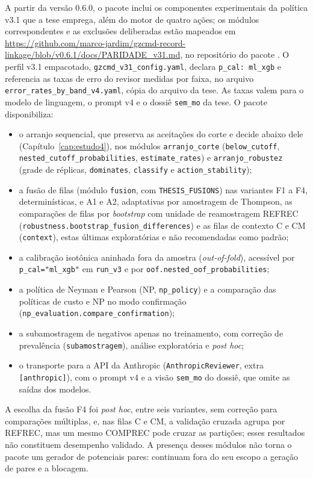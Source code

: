 A partir da versão 0.6.0, o pacote inclui os componentes experimentais da política v3.1 que a tese emprega, além do motor de quatro ações; os módulos correspondentes e as exclusões deliberadas estão mapeados em \url{https://github.com/marco-jardim/gzcmd-record-linkage/blob/v0.6.1/docs/PARIDADE_v31.md}, no repositório do pacote \cite{Jardim2026gzcmd}. O perfil v3.1 empacotado, \texttt{gzcmd\_v31\_config.yaml}, declara \texttt{p\_cal: ml\_xgb} e referencia as taxas de erro do revisor medidas por faixa, no arquivo \texttt{error\_rates\_by\_band\_v4.yaml}, cópia do arquivo da tese. As taxas valem para o modelo de linguagem, o prompt v4 e o dossiê \texttt{sem\_mo} da tese. O pacote disponibiliza:
\begin{itemize}
\item o arranjo sequencial, que preserva as aceitações do corte e decide abaixo dele (Capítulo~\ref{cap:estudo4}), nos módulos \texttt{arranjo\_corte} (\texttt{below\_cutoff}, \texttt{nested\_cutoff\_probabilities}, \texttt{estimate\_rates}) e \texttt{arranjo\_robustez} (grade de réplicas, \texttt{dominates}, \texttt{classify} e \texttt{action\_stability});
\item a fusão de filas (módulo \texttt{fusion}, com \texttt{THESIS\_FUSIONS}) nas variantes F1 a F4, determinísticas, e A1 e A2, adaptativas por amostragem de Thompson, as comparações de filas por \textit{bootstrap} com unidade de reamostragem REFREC (\texttt{robustness.bootstrap\_fusion\_differences}) e as filas de contexto C e CM (\texttt{context}), estas últimas exploratórias e não recomendadas como padrão;
\item a calibração isotônica aninhada fora da amostra (\textit{out-of-fold}), acessível por \texttt{p\_cal="ml\_xgb"} em \texttt{run\_v3} e por \texttt{oof.nested\_oof\_probabilities};
\item a política de Neyman e Pearson (NP, \texttt{np\_policy}) e a comparação das políticas de custo e NP no modo confirmação (\texttt{np\_evaluation.compare\_confirmation});
\item a subamostragem de negativos apenas no treinamento, com correção de prevalência (\texttt{subamostragem}), análise exploratória e \textit{post hoc};
\item o transporte para a API da Anthropic (\texttt{AnthropicReviewer}, extra \texttt{[anthropic]}), com o prompt v4 e a visão \texttt{sem\_mo} do dossiê, que omite as saídas dos modelos.
\end{itemize}
A escolha da fusão F4 foi \textit{post hoc}, entre seis variantes, sem correção para comparações múltiplas, e, nas filas C e CM, a validação cruzada agrupa por REFREC, mas um mesmo COMPREC pode cruzar as partições; esses resultados não constituem desempenho validado. A presença desses módulos não torna o pacote um gerador de potenciais pares: continuam fora do seu escopo a geração de pares e a blocagem.

